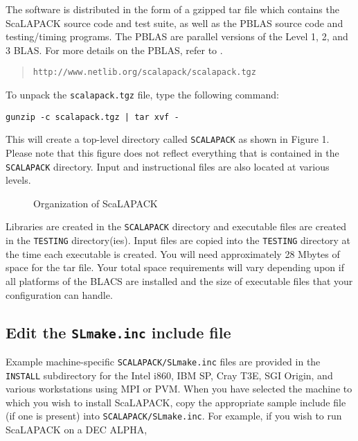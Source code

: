 \documentclass[11pt]{report}
\newcommand{\dent}{\hspace*{\parindent}}
\begin{document}
\dent
The software is distributed in the form of a gzipped
tar file which contains the ScaLAPACK source code and test suite,
as well as the PBLAS source code and testing/timing programs.
The PBLAS are parallel versions of the Level 1, 2, and 3 BLAS.  For
more details on the PBLAS, refer to \cite{lawn100,lawn80}.
\begin{quote}
{\tt http://www.netlib.org/scalapack/scalapack.tgz}
\end{quote}

To unpack the {\tt scalapack.tgz} file, type the following command:
 
\begin{list}{}{}
\item {\tt gunzip -c scalapack.tgz | tar xvf -}
\end{list}

\noindent
This will create a top-level directory called {\tt SCALAPACK} as
shown in Figure 1.  Please note that this figure does not reflect everything
that is contained in the {\tt SCALAPACK} directory.  Input and instructional
files are also located at various levels.
\begin{figure}[tbh!]
\vspace{0.3in}

\caption{Organization of ScaLAPACK}
\vspace{11pt}
\end{figure}
Libraries are created in the {\tt SCALAPACK} directory and 
executable files are created in the {\tt TESTING} directory(ies).  Input
files are copied into the {\tt TESTING} directory at the time each
executable is created.  You will need approximately 28 Mbytes of space
for the tar file.  Your total space requirements will vary depending upon
if all platforms of the BLACS are installed and the size of executable files
that your configuration can handle.

\subsection{Edit the {\tt SLmake.inc} include file}

\dent
Example machine-specific {\tt SCALAPACK/SLmake.inc} files are provided in
the {\tt INSTALL} subdirectory for the Intel i860, IBM SP, Cray T3E,
SGI Origin, and various workstations using MPI or PVM.
When you have selected the machine to
which you wish to install ScaLAPACK, copy the appropriate sample include
file (if one is present) into {\tt SCALAPACK/SLmake.inc}.  For example, if
you wish to run ScaLAPACK on a DEC ALPHA,
\end{document}
